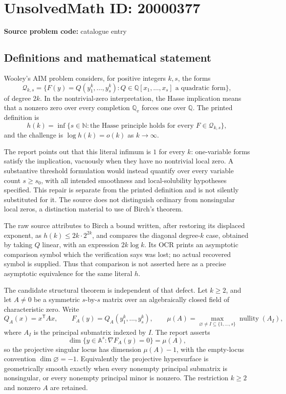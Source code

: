 \documentclass[11pt]{article}
\newcommand{\N}{\mathbb{N}}
\newcommand{\Q}{\mathbb{Q}}
\newcommand{\A}{\mathbb{A}}
\begin{document}
\section*{UnsolvedMath ID: 20000377}
\textbf{Source problem code:} catalogue entry
\subsection{Definitions and mathematical statement}
Wooley's AIM problem considers, for positive integers \(k,s\), the forms
\[
\mathcal Q_{k,s}=\{F(y)=Q(y_1^k,\ldots,y_s^k):Q\in\Q[x_1,\ldots,x_s]\text{ a quadratic form}\},
\]
of degree \(2k\). In the nontrivial-zero interpretation, the Hasse implication means that a nonzero zero over every completion \(\Q_v\) forces one over \(\Q\). The printed definition is
\[
h(k)=\inf\{s\in\N:\text{the Hasse principle holds for every }F\in\mathcal Q_{k,s}\},
\]
and the challenge is \(\log h(k)=o(k)\) as \(k\to\infty\).

The report points out that this literal infimum is \(1\) for every \(k\): one-variable forms satisfy the implication, vacuously when they have no nontrivial local zero. A substantive threshold formulation would instead quantify over every variable count \(s\geq s_0\), with all intended smoothness and local-solubility hypotheses specified. This repair is separate from the printed definition and is not silently substituted for it. The source does not distinguish ordinary from nonsingular local zeros, a distinction material to use of Birch's theorem.

The raw source attributes to Birch a bound written, after restoring its displaced exponent, as \(h(k)\leq2k\cdot2^{2k}\), and compares the diagonal degree-\(k\) case, obtained by taking \(Q\) linear, with an expression \(2k\log k\). Its OCR prints an asymptotic comparison symbol which the verification says was lost; no actual recovered symbol is supplied. Thus that comparison is not asserted here as a precise asymptotic equivalence for the same literal \(h\).

The candidate structural theorem is independent of that defect. Let \(k\geq2\), and let \(A\ne0\) be a symmetric \(s\)-by-\(s\) matrix over an algebraically closed field of characteristic zero. Write
\[
Q_A(x)=x^{\mathsf T}Ax,\qquad F_A(y)=Q_A(y_1^k,\ldots,y_s^k),\qquad
\mu(A)=\max_{\varnothing\ne I\subseteq\{1,\ldots,s\}}\operatorname{nullity}(A_I),
\]
where \(A_I\) is the principal submatrix indexed by \(I\). The report asserts
\[
\dim\{y\in\A^s:\nabla F_A(y)=0\}=\mu(A),
\]
so the projective singular locus has dimension \(\mu(A)-1\), with the empty-locus convention \(\dim\varnothing=-1\). Equivalently the projective hypersurface is geometrically smooth exactly when every nonempty principal submatrix is nonsingular, or every nonempty principal minor is nonzero. The restriction \(k\geq2\) and nonzero \(A\) are retained.
\end{document}
